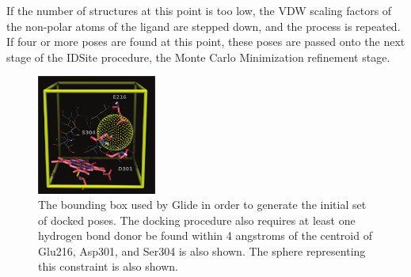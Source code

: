 If the number of structures at this point is too low, the VDW scaling factors of the non-polar atoms of the ligand are stepped down, and the process is repeated.
If four or more poses are found at this point, these poses are passed onto the next stage of the IDSite procedure, the Monte Carlo Minimization refinement stage.

\begin{figure}[h]
\centering
\includegraphics[width=0.35\textwidth]{figures/idsite/glide.png}
\caption{The bounding box used by Glide in order to generate the initial set of docked poses.
The docking procedure also requires at least one hydrogen bond donor be found within 4 angstroms of the centroid of Glu216, Asp301, and Ser304 is also shown.
The sphere representing this constraint is also shown.}
\label{fig:idsite_glide}
\end{figure}


